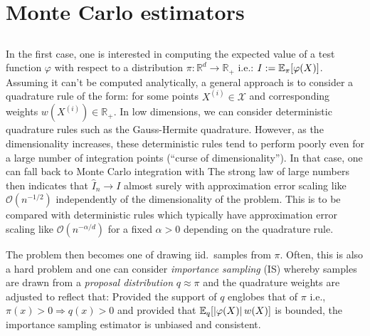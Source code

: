 
\section{Monte Carlo estimators}

\subsection{}

In the first case, one is interested in computing the expected value of a test function $\varphi$ with respect to a distribution $\pi:\mathbb R^{d} \to \mathbb R_+$ i.e.: $I:=\mathbb E_\pi[\varphi(X)]$. Assuming it can't be computed analytically, a general approach is to consider a quadrature rule of the form:
%
%
for some points $X^{(i)}\in\mathcal X$ and corresponding weights $w(X^{(i)})\in\mathbb R_+$. In low dimensions, we can consider deterministic quadrature rules such as the Gauss-Hermite quadrature. However, as the dimensionality increases, these deterministic rules tend to perform poorly even for a large number of integration points (``curse of dimensionality''). In that case, one can fall back to Monte Carlo integration with
%
%
The strong law of large numbers then indicates that $\widehat I_n\to I$ almost surely with approximation error scaling like $\mathcal O(n^{-1/2})$ independently of the dimensionality of the problem. This is to be compared with deterministic rules which typically have approximation error scaling like $\mathcal O(n^{-\alpha/d})$ for a fixed $\alpha>0$ depending on the quadrature rule.

The problem then becomes one of drawing iid.\ samples from $\pi$. Often, this is also a hard problem and one can consider \emph{importance sampling} (IS) whereby samples are drawn from a \emph{proposal distribution} $q\approx \pi$ and the quadrature weights are adjusted to reflect that:
%
%
Provided the support of $q$ englobes that of $\pi$ i.e., $\pi(x)>0\Rightarrow q(x)>0$ and provided that $\mathbb E_q[\left|\varphi(X)\right|w(X)]$ is bounded, the importance sampling estimator is unbiased and consistent.


